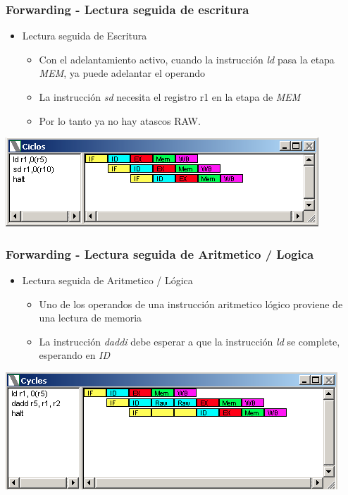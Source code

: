 \documentclass{beamer}
\begin{document}
\begin{frame}[fragile]
\frametitle{Forwarding - Lectura seguida de escritura}
\begin{itemize}
\item Lectura seguida de Escritura
\begin{itemize}
\item Con el adelantamiento activo, cuando la instrucción \emph{ld} pasa la etapa \emph{MEM}, ya puede adelantar el operando
\item La instrucción \emph{sd} necesita el registro r1 en la etapa de \emph{MEM}
\item Por lo tanto ya no hay atascos RAW.
\end{itemize}
\end{itemize}
\includegraphics[scale=0.45]{forwarding-1-lectura-escritura.png}
\end{frame}


\begin{frame}[fragile]
\frametitle{Forwarding - Lectura seguida de Aritmetico / Logica}
\begin{itemize}
\item Lectura seguida de Aritmetico / Lógica
\begin{itemize}
\item Uno de los operandos de una instrucción aritmetico lógico proviene de una lectura de memoria
\item La instrucción \emph{daddi} debe esperar a que la instrucción \emph{ld} se complete, esperando en \emph{ID}
\end{itemize}
\end{itemize}
\includegraphics[scale=0.45]{forwarding-2.png}
\end{frame}
\end{document}
